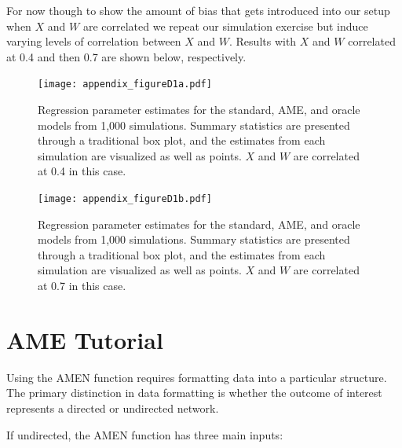 \documentclass[12pt]{amsart}
\begin{document}
For now though to show the amount of bias that gets introduced into our setup when $X$ and $W$ are correlated we repeat our simulation exercise but induce varying levels of correlation between $X$ and $W$. Results with $X$ and $W$ correlated at 0.4 and then 0.7 are shown below, respectively.

\begin{figure}[ht]
\caption{Regression parameter estimates for the standard, AME, and oracle models from 1,000 simulations. Summary statistics are presented through a traditional box plot, and the estimates from each simulation are visualized as well as points. $X$ and $W$ are correlated at 0.4 in this case.}
\label{fig:ameBias_corrMed}
\texttt{[image: appendix\_figureD1a.pdf]} \\
\end{figure}

\begin{figure}[ht]
\caption{Regression parameter estimates for the standard, AME, and oracle models from 1,000 simulations. Summary statistics are presented through a traditional box plot, and the estimates from each simulation are visualized as well as points. $X$ and $W$ are correlated at 0.7 in this case.}
\label{fig:ameBias_corrHi}
\texttt{[image: appendix\_figureD1b.pdf]} \\
\end{figure}

\FloatBarrier
\clearpage

\section{AME Tutorial}

Using the AMEN function requires formatting data into a particular structure. The primary distinction in data formatting is whether the outcome of interest represents a directed or undirected network.

If undirected, the AMEN function has three main inputs:
\end{document}
